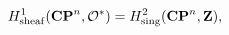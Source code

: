 \begin{equation}
H^1_{\rm sheaf}({\bf CP}^n, {\cal O}^*)=H^2_{\rm sing}({\bf CP}^n, {\bf Z}),
\label{tsmplif}
\end{equation}

